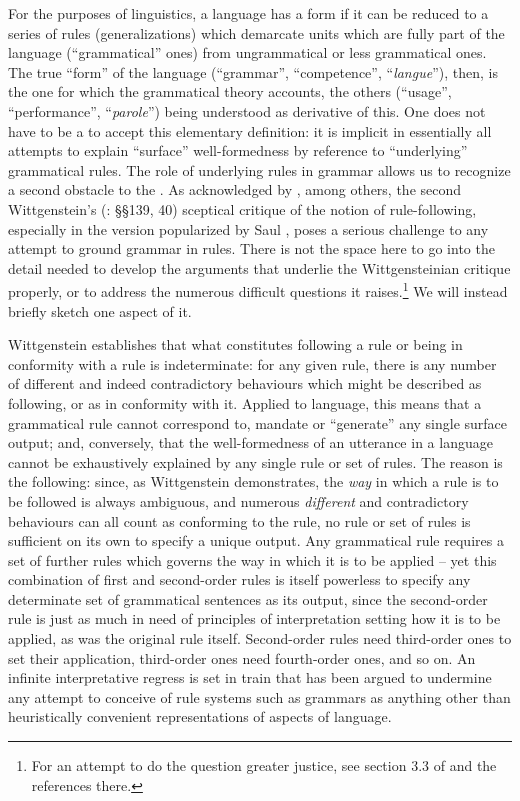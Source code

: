 \documentclass[output=paper]{langscibook}
\begin{document}
For the purposes of linguistics, a language has a form if it can be reduced to a series of rules (generalizations) which demarcate units which are fully part of the language (``grammatical'' ones) from ungrammatical or less grammatical ones. The true ``form'' of the language (``grammar'', ``competence'', ``\emph{langue}''), then, is the one for which the grammatical theory accounts, the others (``usage'', ``performance'', ``\emph{parole}'') being understood as derivative of this. One does not have to be a  to accept this elementary definition: it is implicit in essentially all attempts to explain ``surface'' well-formedness by reference to ``underlying'' grammatical rules. The role of underlying rules in grammar allows us to recognize a second obstacle to the . As acknowledged by \citet{Chomsky1986}, among others, the second Wittgenstein's (\citeyear{Wittgenstein20011953}: §§139, 40) sceptical critique of the notion of rule-following, especially in the version popularized by Saul \citet{Kripke1982}, poses a serious challenge to any attempt to ground grammar in rules. There is not the space here to go into the detail needed to develop the arguments that underlie the Wittgensteinian critique properly, or to address the numerous difficult questions it raises.\footnote{For an attempt to do the question greater justice, see section 3.3 of \citet{Riemer2005} and the references there.} We will instead briefly sketch one aspect of it.

Wittgenstein establishes that what constitutes following a rule or being in conformity with a rule is indeterminate: for any given rule, there is any number of different and indeed contradictory behaviours which might be described as following, or as in conformity with it. Applied to language, this means that a grammatical rule cannot correspond to, mandate or ``generate'' any single surface output; and, conversely, that the well-formedness of an utterance in a language cannot be exhaustively explained by any single rule or set of rules. The reason is the following: since, as Wittgenstein demonstrates, the \emph{way} in which a rule is to be followed is always ambiguous, and numerous \emph{different} and contradictory behaviours can all count as conforming to the rule, no rule or set of rules is sufficient on its own to specify a unique output. Any grammatical rule requires a set of further rules which governs the way in which it is to be applied -- yet this combination of first and second-order rules is itself powerless to specify any determinate set of grammatical sentences as its output, since the second-order rule is just as much in need of principles of interpretation setting how it is to be applied, as was the original rule itself. Second-order rules need third-order ones to set their application, third-order ones need fourth-order ones, and so on. An infinite interpretative regress is set in train that has been argued to undermine any attempt to conceive of rule systems such as grammars as anything other than heuristically convenient representations of aspects of language.
\end{document}
